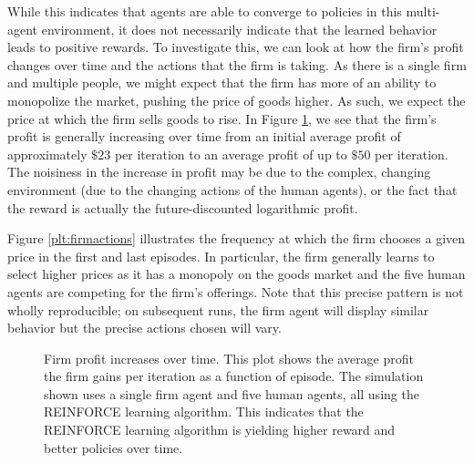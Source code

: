 \documentclass[twoside,twocolumn]{article}
\begin{document}
While this indicates that agents are able to converge to policies in this multi-agent environment, it does not necessarily indicate that the learned behavior leads to positive rewards. To investigate this, we can look at how the firm's profit changes over time and the actions that the firm is taking. As there is a single firm and multiple people, we might expect that the firm has more of an ability to monopolize the market, pushing the price of goods higher. As such, we expect the price at which the firm sells goods to rise. In Figure \ref{plt:firmprofitincrease}, we see that the firm's profit is generally increasing over time from an initial average profit of approximately $\$23$ per iteration to an average profit of up to $\$50$ per iteration. The noisiness in the increase in profit may be due to the complex, changing environment (due to the changing actions of the human agents), or the fact that the reward is actually the future-discounted logarithmic profit.

\medskip 

Figure \ref{plt:firmactions} illustrates the frequency at which the firm chooses a given price in the first and last episodes. In particular, the firm generally learns to select higher prices as it has a monopoly on the goods market and the five human agents are competing for the firm's offerings. Note that this precise pattern is not wholly reproducible; on subsequent runs, the firm agent will display similar behavior but the precise actions chosen will vary.  

\begin{figure}[h]
  \caption{Firm profit increases over time. This plot shows the average profit the firm gains per iteration as a function of episode. The simulation shown uses a single firm agent and five human agents, all using the REINFORCE learning algorithm. This indicates that the REINFORCE learning algorithm is yielding higher reward and better policies over time.}
  \label{plt:firmprofitincrease}
  \end{figure}
\end{document}
